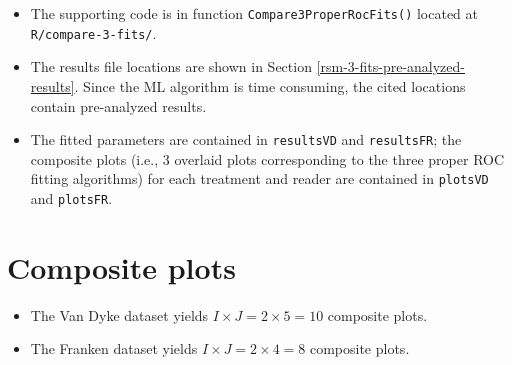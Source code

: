 \documentclass[
]{book}
\newenvironment{Shaded}{\begin{snugshade}}{\end{snugshade}}
\newcommand{\CommentTok}[1]{\textcolor[rgb]{0.56,0.35,0.01}{\textit{#1}}}
\newcommand{\FunctionTok}[1]{\textcolor[rgb]{0.00,0.00,0.00}{#1}}
\newcommand{\NormalTok}[1]{#1}
\newcommand{\OtherTok}[1]{\textcolor[rgb]{0.56,0.35,0.01}{#1}}
\newcommand{\SpecialCharTok}[1]{\textcolor[rgb]{0.00,0.00,0.00}{#1}}
\newcommand{\StringTok}[1]{\textcolor[rgb]{0.31,0.60,0.02}{#1}}
\providecommand{\tightlist}{%
  \setlength{\itemsep}{0pt}\setlength{\parskip}{0pt}}
\begin{document}
\begin{Shaded}
\end{Shaded}

\begin{itemize}
\tightlist
\item
  The supporting code is in function \texttt{Compare3ProperRocFits()} located at \texttt{R/compare-3-fits/}.
\item
  The results file locations are shown in Section \ref{rsm-3-fits-pre-analyzed-results}. Since the ML algorithm is time consuming, the cited locations contain pre-analyzed results.
\item
  The fitted parameters are contained in \texttt{resultsVD} and \texttt{resultsFR}; the composite plots (i.e., 3 overlaid plots corresponding to the three proper ROC fitting algorithms) for each treatment and reader are contained in \texttt{plotsVD} and \texttt{plotsFR}.
\end{itemize}

\hypertarget{rsm-3-fits-composite-plots}{%
\section{Composite plots}\label{rsm-3-fits-composite-plots}}

\begin{itemize}
\tightlist
\item
  The Van Dyke dataset yields \(I \times J = 2 \times 5 = 10\) composite plots.
\item
  The Franken dataset yields \(I \times J = 2 \times 4 = 8\) composite plots.
\end{itemize}
\end{document}
